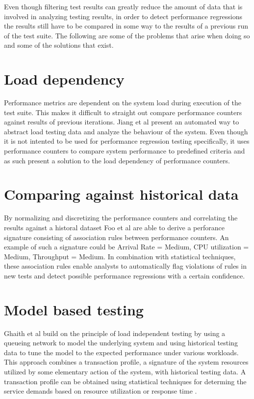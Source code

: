 Even though filtering test results can greatly reduce the amount of data that is involved in analyzing testing results, in order to detect performance regressions the results still have to be compared in some way to the results of a previous run of the test suite. The following are some of the problems that arise when doing so and some of the solutions that exist.

\section{Load dependency}
Performance metrics are dependent on the system load during execution of the test suite. This makes it difficult to straight out compare performance counters against results of previous iterations. Jiang et al present an automated way to abstract load testing data and analyze the behaviour of the system. \cite{jiang2010automated} Even though it is not intented to be used for performance regression testing specifically, it uses performance counters to compare system performance to predefined criteria and as such present a solution to the load dependency of performance counters.

\section{Comparing against historical data}
By normalizing and discretizing the performance counters and correlating the results against a historal dataset Foo et al are able to derive a perforance signature \cite{foo2010mining} consisting of association rules between performance counters. An example of such a signature could be {Arrival Rate = Medium, CPU utilization = Medium, Throughput = Medium}. In combination with statistical techniques, these association rules enable analysts to automatically flag violations of rules in new tests and detect possible performance regressions with a certain confidence.

\section{Model based testing}
Ghaith et al build on the principle of load independent testing by using a queueing network to model the underlying system and using historical testing data to tune the model to the expected performance under various workloads. \cite{ghaith2013profile} This approach combines a transaction profile, a signature of the system resources utilized by some elementary action of the system, with historical testing data. A transaction profile can be obtained using statistical techniques for determing the service demands based on resource utilization \cite{casale2008robust} or response time \cite{kraft2009estimating}.
